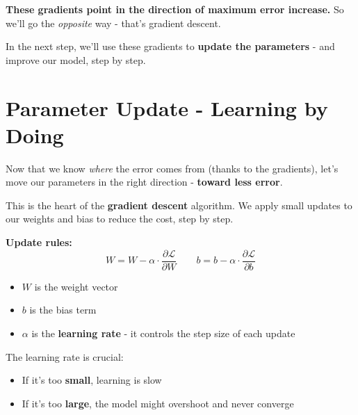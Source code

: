 \documentclass[11pt]{article}
\begin{document}
\begin{tcolorbox}[colback=white!98!gray, colframe=gray!30!black, arc=1mm]
\textbf{These gradients point in the direction of maximum error increase.}  
So we'll go the \textit{opposite} way - that's gradient descent.
\end{tcolorbox}

\vspace{1em}

In the next step, we'll use these gradients to \textbf{update the parameters} - and improve our model, step by step.

\section*{Parameter Update - Learning by Doing}

\begin{tcolorbox}[colback=gray!5, colframe=black!50, title=Step 5: Adjust and Improve, fonttitle=\bfseries, arc=2mm]
Now that we know \textit{where} the error comes from (thanks to the gradients),  
let's move our parameters in the right direction - \textbf{toward less error}.
\end{tcolorbox}

\vspace{1em}

This is the heart of the \textbf{gradient descent} algorithm.  
We apply small updates to our weights and bias to reduce the cost, step by step.

\bigskip

\noindent\textbf{Update rules:}
\[
W = W - \alpha \cdot \frac{\partial \mathcal{L}}{\partial W}
\quad\quad
b = b - \alpha \cdot \frac{\partial \mathcal{L}}{\partial b}
\]

\begin{itemize}
    \item $W$ is the weight vector
    \item $b$ is the bias term
    \item $\alpha$ is the \textbf{learning rate} - it controls the step size of each update
\end{itemize}

\vspace{0.5em}

The learning rate is crucial:  
\begin{itemize}
    \item If it's too \textbf{small}, learning is slow
    \item If it's too \textbf{large}, the model might overshoot and never converge
\end{itemize}
\end{document}
